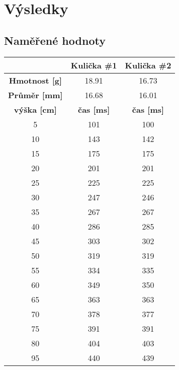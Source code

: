 \documentclass[titlepage]{article}
\begin{document}
	\section{Výsledky}
		\subsection{Naměřené hodnoty}
			\begin{table}[!h]
				\begin{tabular}{|c|c|c|}
					\hline
					 & \textbf{Kulička \#1} & \textbf{Kulička \#2}\\
					 \hline\hline
					 \textbf{Hmotnost [g]} & 18.91 & 16.73\\
					 \hline
					 \textbf{Průměr [mm]} & 16.68 & 16.01\\
					 \hline\hline
					 
					 \textbf{výška [cm]} & \textbf{čas [ms]} & \textbf{čas [ms]}\\
					 \hline\hline
					 5  & 101 & 100 \\ \hline
					 10 & 143 & 142 \\ \hline
					 15 & 175 & 175 \\ \hline
 				   	 20 & 201 & 201 \\ \hline
					 25 & 225 & 225 \\ \hline
					 30 & 247 & 246 \\ \hline
					 35 & 267 & 267 \\ \hline
					 40 & 286 & 285 \\ \hline
					 45 & 303 & 302 \\ \hline
					 50 & 319 & 319 \\ \hline
					 55 & 334 & 335 \\ \hline
					 60 & 349 & 350 \\ \hline
					 65 & 363 & 363 \\ \hline
 					 70 & 378 & 377 \\ \hline
					 75 & 391 & 391 \\ \hline
					 80 & 404 & 403 \\ \hline
					 95 & 440 & 439 \\ \hline
				\end{tabular}
			\end{table}
		
\end{document}
